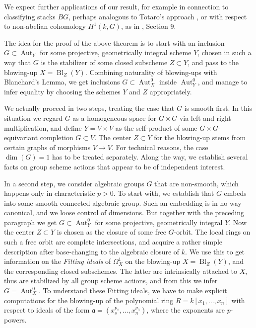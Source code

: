 \documentclass[oneside, 12pt]{amsart}
\theoremstyle{definition}
\theoremstyle{remark}
\newcommand{\ideala}{\mathfrak{a}}
\newcommand{\Aut}{\operatorname{Aut}}
\newcommand{\Bl}{\operatorname{Bl}}
\newcommand{\ra}{\rightarrow}
\begin{document}
We expect further applications of our result, for example in connection to classifying stacks $BG$, 
perhaps analogous to Totaro's approach \cite{Totaro 1999}, 
or with respect to non-abelian cohomology $H^1(k,G)$, as in \cite{Hilario; Schroeer 2023}, Section 9.

The idea for the proof of the above theorem  is to start with an inclusion $G\subset\Aut_Y$ 
for some  projective, geometrically integral scheme $Y$, chosen in such a way 
that $G$ is the stabilizer of some closed subscheme $Z\subset Y$, and     
pass to the blowing-up $X=\Bl_Z(Y)$. Combining naturality of blowing-ups 
with Blanchard's Lemma, we get inclusions $G\subset\Aut^0_X$ inside $\Aut^0_Y$,
and manage to infer equality by choosing the schemes $Y$ and $Z$  appropriately.
 
We actually proceed in two steps, treating the case that $G$ is smooth first. 
In this situation we regard $G$ as a homogeneous space for $G\times G$ 
via left and right multiplication, and define $Y=V\times V$  as the self-product
of some  $G \times G$-equivariant completion 
$G\subset V$. The center $Z\subset Y$ for the blowing-up 
stems from  certain graphs of morphisms $V\ra V$. 
For technical reasons, the case $\dim(G)=1$ has to be treated separately.
Along the way, we establish several facts on group scheme actions that appear to be of independent interest.

In a second step, we consider algebraic groups $G$ that are non-smooth, 
which happens only in characteristic $p>0$. 
To start with, we establish that $G$ embeds into some smooth connected 
algebraic group. Such an embedding is in no way canonical, and we loose 
control of dimensions. But together with the preceding paragraph we get  
$G\subset\Aut^0_Y$ for some projective, geometrically integral $Y$.   
Now the center $Z\subset Y$ is chosen as the  closure of some free $G$-orbit.
The local rings on such a free orbit are complete intersections, and acquire a rather simple description after base-changing to the algebraic closure of $k$.
We use this to get information on the \emph{Fitting ideals} of 
$\Omega^1_X$ on the blowing-up $X=\Bl_Z(Y)$, and the corresponding closed subschemes.
The latter are intrinsically attached to $X$, thus are stabilized by all group scheme actions,
and from  this we  infer $G=\Aut^0_X$. 
To understand these Fitting ideals, we have to make  explicit computations for  the blowing-up of the polynomial ring
$R=k[x_1,\ldots,x_n]$ with respect to ideals of the form $\ideala=(x_s^{\nu_s},\ldots,x_n^{\nu_n})$,
where the exponents are $p$-powers.  
 
\end{document}

